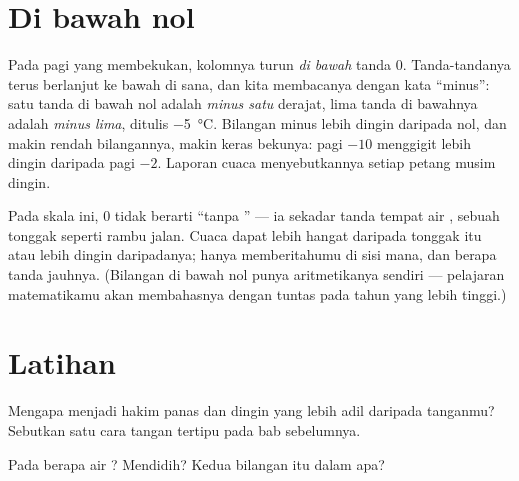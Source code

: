 \section{Di bawah nol}

\begin{example}\label{ex:g3:temperature-thermometers:belowzero}
Pada pagi yang membekukan, kolomnya turun \emph{di bawah} tanda $0$.
Tanda-tandanya terus berlanjut ke bawah di sana, dan kita membacanya
dengan kata ``minus'': satu tanda di bawah nol adalah \emph{minus
satu} derajat, lima tanda di bawahnya adalah \emph{minus lima},
ditulis \qty{-5}{\celsius}. Bilangan minus lebih dingin daripada nol,
dan makin rendah bilangannya, makin keras bekunya: pagi $-10$
menggigit lebih dingin daripada pagi $-2$. Laporan cuaca
menyebutkannya setiap petang musim dingin.
\end{example}

\begin{remark}\label{rem:g3:temperature-thermometers:zero}
Pada skala ini, $0$ tidak berarti ``tanpa '' --- ia sekadar tanda
tempat air , sebuah tonggak seperti rambu jalan. Cuaca dapat
lebih hangat daripada tonggak itu atau lebih dingin daripadanya;
 hanya memberitahumu di sisi mana, dan berapa tanda jauhnya.
(Bilangan di bawah nol punya aritmetikanya sendiri --- pelajaran
matematikamu akan membahasnya dengan tuntas pada tahun yang lebih
tinggi.)
\end{remark}

\section{Latihan}

\begin{exercise}[$\star$]\label{exo:g3:temperature-thermometers:1}
Mengapa  menjadi hakim panas dan dingin yang lebih adil
daripada tanganmu? Sebutkan satu cara tangan tertipu pada bab
sebelumnya.
\end{exercise}

\begin{exercise}[$\star$]\label{exo:g3:temperature-thermometers:2}
Pada  berapa air ? Mendidih? Kedua bilangan itu dalam
 apa?
\end{exercise}

